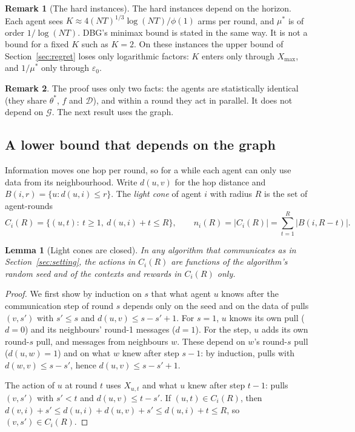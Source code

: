 \documentclass[11pt]{article}
\newtheorem{lemma}[theorem]{Lemma}
\theoremstyle{definition}
\newtheorem{remark}{Remark}
\newcommand{\Xmax}{X_{\max}}
\newcommand{\eps}{\varepsilon}
\newcommand{\cG}{\mathcal{G}}
\begin{document}
\begin{remark}[The hard instances]\label{rem:hard}
The hard instances depend on the horizon. Each agent sees $K\approx4(NT)^{1/3}\log(NT)/\phi(1)$ arms per round, and
$\mu^*$ is of order $1/\log(NT)$. DBG's minimax bound is stated in the same way. It is not a bound for a fixed $K$
such as $K=2$. On these instances the upper bound of Section~\ref{sec:regret} loses only logarithmic factors: $K$
enters only through $\Xmax$, and $1/\mu^*$ only through $\eps_0$.
\end{remark}

\begin{remark}
The proof uses only two facts: the agents are statistically identical (they share $\theta^*$, $f$ and $\mathcal D$),
and within a round they act in parallel. It does not depend on $\cG$. The next result uses the graph.
\end{remark}

\subsection{A lower bound that depends on the graph}

Information moves one hop per round, so for a while each agent can only use data from its neighbourhood. Write
$d(u,v)$ for the hop distance and $B(i,r)=\{u:d(u,i)\le r\}$. The \emph{light cone} of agent $i$ with radius $R$ is the
set of agent-rounds
\[
C_i(R)=\{(u,t):\ t\ge1,\ d(u,i)+t\le R\},\qquad n_i(R)=|C_i(R)|=\sum_{t=1}^{R}|B(i,R-t)| .
\]

\begin{lemma}[Light cones are closed]\label{lem:cone}
In any algorithm that communicates as in Section~\ref{sec:setting}, the actions in $C_i(R)$ are functions of the
algorithm's random seed and of the contexts and rewards in $C_i(R)$ only.
\end{lemma}
\begin{proof}
We first show by induction on $s$ that what agent $u$ knows after the communication step of round $s$ depends only on
the seed and on the data of pulls $(v,s')$ with $s'\le s$ and $d(u,v)\le s-s'+1$. For $s=1$, $u$ knows its own pull
($d=0$) and its neighbours' round-1 messages ($d=1$). For the step, $u$ adds its own round-$s$ pull, and messages from
neighbours $w$. These depend on $w$'s round-$s$ pull ($d(u,w)=1$) and on what $w$ knew after step $s-1$: by induction,
pulls with $d(w,v)\le s-s'$, hence $d(u,v)\le s-s'+1$.

The action of $u$ at round $t$ uses $X_{u,t}$ and what $u$ knew after step $t-1$: pulls $(v,s')$ with $s'<t$ and
$d(u,v)\le t-s'$. If $(u,t)\in C_i(R)$, then $d(v,i)+s'\le d(u,i)+d(u,v)+s'\le d(u,i)+t\le R$, so $(v,s')\in C_i(R)$.
\end{proof}
\end{document}
